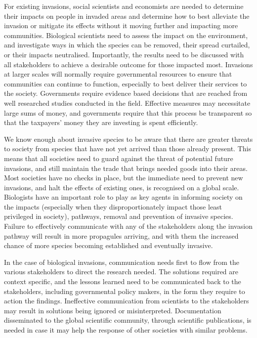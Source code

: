 \documentclass[
]{krantz}
\begin{document}
For existing invasions, social scientists and economists are needed to determine their impacts on people in invaded areas and determine how to best alleviate the invasion or mitigate its effects without it moving further and impacting more communities. Biological scientists need to assess the impact on the environment, and investigate ways in which the species can be removed, their spread curtailed, or their impacts neutralised. Importantly, the results need to be discussed with all stakeholders to achieve a desirable outcome for those impacted most. Invasions at larger scales will normally require governmental resources to ensure that communities can continue to function, especially to best deliver their services to the society. Governments require evidence based decisions that are reached from well researched studies conducted in the field. Effective measures may necessitate large sums of money, and governments require that this process be transparent so that the taxpayers' money they are investing is spent efficiently.

We know enough about invasive species to be aware that there are greater threats to society from species that have not yet arrived than those already present. This means that all societies need to guard against the threat of potential future invasions, and still maintain the trade that brings needed goods into their areas. Most societies have no checks in place, but the immediate need to prevent new invasions, and halt the effects of existing ones, is recognised on a global scale. Biologists have an important role to play as key agents in informing society on the impacts (especially when they disproportionately impact those least privileged in society), pathways, removal and prevention of invasive species. Failure to effectively communicate with any of the stakeholders along the invasion pathway will result in more propagules arriving, and with them the increased chance of more species becoming established and eventually invasive.

In the case of biological invasions, communication needs first to flow from the various stakeholders to direct the research needed. The solutions required are context specific, and the lessons learned need to be communicated back to the stakeholders, including governmental policy makers, in the form they require to action the findings. Ineffective communication from scientists to the stakeholders may result in solutions being ignored or misinterpreted. Documentation disseminated to the global scientific community, through scientific publications, is needed in case it may help the response of other societies with similar problems.
\end{document}
